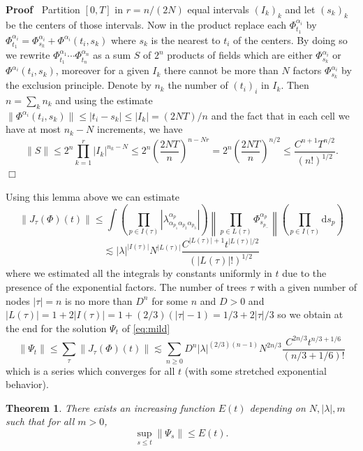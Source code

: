 \documentclass{article}
\newcommand{\mathd}{\mathrm{d}}
\newenvironment{proof}{\noindent\textbf{Proof\ }}{\hspace*{\fill}$\Box$\medskip}
\newtheorem{theorem}{Theorem}
\begin{document}
\begin{proof}
  Partition $[0, T]$ in $r = n / (2 N)$ equal intervals $(I_k)_k$ and let
  $(s_k)_k$ be the centers of those intervals. Now in the product replace each
  $\Phi^{\alpha_i}_{t_1}$ by $\Phi^{\alpha_i}_{t_1} = \Phi^{\alpha_i}_{s_k} +
  \Phi^{\alpha_i} (t_i, s_k)$ where $s_k$ is the nearest to $t_i$ of the
  centers. By doing so we rewrite $\Phi^{\alpha_1}_{t_1} \cdots
  \Phi^{\alpha_n}_{t_n}$ as a sum $S$ of $2^n$ products of fields which are
  either $\Phi^{\alpha_i}_{s_k}$ or \ $\Phi^{\alpha_i} (t_i, s_k)$, moreover
  for a given $I_k$ there cannot be more than $N$ factors
  $\Phi^{\alpha_i}_{s_k}$ by the exclusion principle. Denote by $n_k$ the
  number of $(t_i)_i$ in $I_k$. Then $n = \sum_k n_k$ and using the estimate
  $\| \Phi^{\alpha_i} (t_i, s_k) \| \leqslant | t_i - s_k | \leqslant | I_k |
  = (2 N T) / n$ and the fact that in each cell we have at most $n_k - N$
  increments, we have
  \[ \| S \| \leqslant 2^n \prod_{k = 1}^r | I_k |^{n_k - N} \leqslant 2^n
     \left( \frac{2 N T}{n} \right)^{n - N r} = 2^n \left( \frac{2 N T}{n}
     \right)^{n / 2} \leqslant \frac{C^{n + 1} T^{n / 2}}{(n!)^{1 / 2}} . \]
\end{proof}

Using this lemma above we can estimate
\[ \| J_{\tau} (\Phi) (t) \| \leqslant \int \left( \prod_{p \in I (\tau)}
   \left| \lambda^{\alpha_p}_{\alpha_{p_1} \alpha_{p_2} \alpha_{p_3}} \right|
   \right) \left\| \prod_{p \in L (\tau)} \Phi^{\alpha_p}_{s_{p_-}} \right\|
   \left( \prod_{p \in I (\tau)} \mathd s_p \right) \]
\[ \lesssim | \lambda |^{| I (\tau) |} N^{| L (\tau) |} \frac{C^{| L (\tau) |
   + 1} t^{| L (\tau) | / 2}}{(| L (\tau) | !)^{1 / 2}} \]
where we estimated all the integrals by constants uniformly in $t$ due to the
presence of the exponential factors. The number of trees $\tau$ with a given
number of nodes $| \tau | = n$ is no more than $D^n$ for some $n$ and $D > 0$
and $| L (\tau) | = 1 + 2 | I (\tau) | = 1 + (2 / 3) (| \tau | - 1) = 1 / 3 +
2 | \tau | / 3$ so we obtain at the end for the solution $\Psi_t$ of
{\eqref{eq:mild}}
\[ \| \Psi_t \| \leqslant \sum_{\tau} \| J_{\tau} (\Phi) (t) \| \lesssim
   \sum_{n \geqslant 0} D^n | \lambda |^{(2 / 3) (n - 1)} N^{2 n / 3}
   \frac{C^{2 n / 3} t^{n / 3 + 1 / 6}}{(n / 3 + 1 / 6) !} \]
which is a series which converges for all $t$ (with some stretched exponential
behavior).

\begin{theorem}
  There exists an increasing function $E (t)$ depending on $N, | \lambda |, m$
  such that for all $m > 0$,
  \[ \sup_{s \leqslant t} \| \Psi_s \| \leqslant E (t) . \]
\end{theorem}
\end{document}
